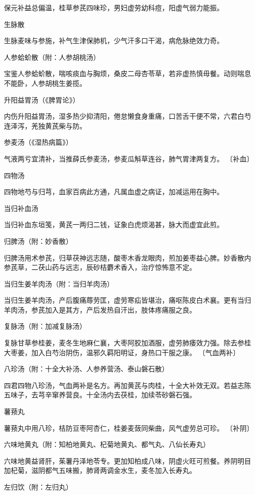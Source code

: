 \documentclass[a4paper,12pt,UTF8,twoside]{ctexbook}
\begin{document}
保元补益总偏温，桂草参芪四味珍，男妇虚劳幼科痘，阳虚气弱力能振。

生脉散

生脉麦味与参施，补气生津保肺机，少气汗多口干渴，病危脉绝效力奇。

人参蛤蚧散（附：人参胡桃汤）

宝鉴人参蛤蚧散，喘咳痰血与胸烦，桑皮二母杏苓草，若非虚热慎毋餐。动则喘息不能卧，人参胡桃生姜揽。

升阳益胃汤（《脾胃论》）

内伤升阳益胃汤，湿多热少抑清阳，倦怠懒食身重痛，口苦舌干便不常，六君白芍连泽泻，羌独黄芪柴与防。

参麦汤（《湿热病篇》）

气液两亏宜清补，当推薛氏参麦汤，参麦瓜斛草连谷，肺气胃津两复方。
〔补血〕

四物汤

四物地芍与归芎，血家百病此方通，凡属血虚之病证，加减运用在胸中。

当归补血汤

当归补血东垣笺，黄芪一两归二钱，证象白虎烦渴甚，脉大而虚宜此煎。

归脾汤（附：妙香散）

归脾汤用术参芪，归草茯神远志随，酸枣木香龙眼肉，煎加姜枣益心脾。妙香散内参芪草，二茯山药与远志，辰砂桔麝术香入，治疗惊怖意不定。

当归生姜羊肉汤（附：当归羊肉汤）

当归生姜羊肉汤，产后腹痛蓐劳匡，虚劳寒疝皆堪治，痛呕陈皮白术襄。更有当归羊肉汤，参芪加入是其方，产后发热自汗出，肢体疼痛服之良。

复脉汤（附：加减复脉汤）

复脉甘草参桂姜，麦冬生地麻仁襄，大枣阿胶加酒服，虚劳肺痿效力强。除去参桂大枣姜，加入白芍治阴伤，温邪久羁阳明证，身热口干服之康。
〔气血两补〕

八珍汤（附：十全大补汤、人参养营汤、泰山磐石散）

四君四物八珍汤，气血两补是名方。再加黄芪与肉桂，十全大补效无双。若益志陈五味子，去芎辛窜养营良。十全汤内去茯桂，加续苓砂磐石强。

薯蓣丸

薯蓣丸中用八珍，桔防豆枣阿杏仁，桂姜麦蔹同柴曲，风气虚劳总可珍。
〔补阴〕

六味地黄丸（附：知柏地黄丸、杞菊地黄丸、都气丸、八仙长寿丸）

六味地黄益肾肝，茱薯丹泽地苓专。更加知柏成八味，阴虚火旺可煎餐。养阴明目加杞菊，滋阴都气五味搬，肺肾两调金水生，麦冬加入长寿丸。

左归饮（附：左归丸）
\end{document}
